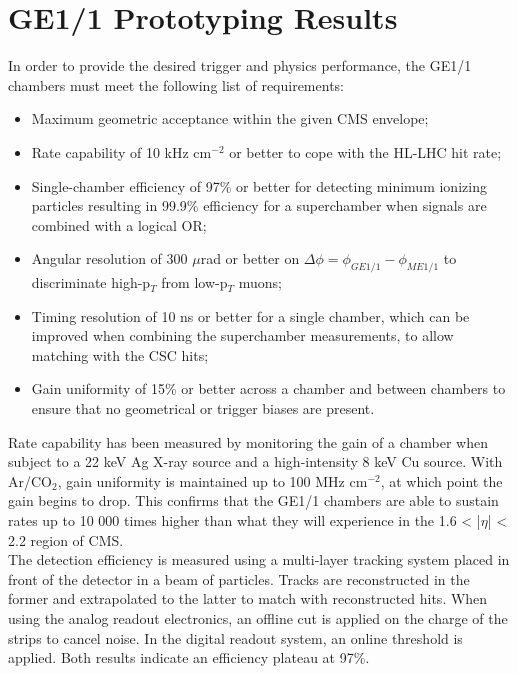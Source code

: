   \section{GE1/1 Prototyping Results}

    In order to provide the desired trigger and physics performance, the GE1/1 chambers must meet the following list of requirements:
    \begin{itemize}
      \item Maximum geometric acceptance within the given CMS envelope;
      \item Rate capability of 10 kHz cm$^{-2}$ or better to cope with the HL-LHC hit rate;
      \item Single-chamber efficiency of 97\% or better for detecting minimum ionizing particles resulting in 99.9\% efficiency for a superchamber when signals are combined with a logical OR;
      \item Angular resolution of 300 $\mu$rad or better on $ \Delta \phi = \phi_{GE1/1} - \phi_{ME1/1} $ to discriminate high-p$_T$ from low-p$_T$ muons;
      \item Timing resolution of 10 ns or better for a single chamber, which can be improved when combining the superchamber measurements, to allow matching with the CSC hits;
      \item Gain uniformity of 15\% or better across a chamber and between chambers to ensure that no geometrical or trigger biases are present. \\
    \end{itemize}

    Rate capability has been measured by monitoring the gain of a chamber when subject to a 22 keV Ag X-ray source and a high-intensity 8 keV Cu source. With Ar/CO$_2$, gain uniformity is maintained up to 100 MHz cm$^{-2}$, at which point the gain begins to drop. This confirms that the GE1/1 chambers are able to sustain rates up to 10 000 times higher than what they will experience in the 1.6 < |$\eta$| < 2.2 region of CMS. \\

    The detection efficiency is measured using a multi-layer tracking system placed in front of the detector in a beam of particles. Tracks are reconstructed in the former and extrapolated to the latter to match with reconstructed hits. When using the analog readout electronics, an offline cut is applied on the charge of the strips to cancel noise. In the digital readout system, an online threshold is applied. Both results indicate an efficiency plateau at 97\%. \\

